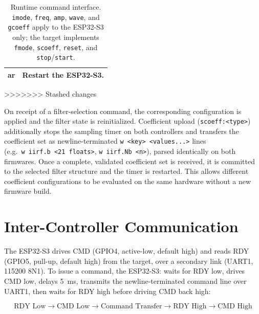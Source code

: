 \begin{table}[H]
\begin{tabularx}{\textwidth}{
        >{\ttfamily\raggedright\arraybackslash}p{}
        >{\raggedright\arraybackslash}X
        }
        ar                                              & Restart the ESP32-S3.                                                \\

        \bottomrule
    \end{tabularx}
    \caption{Runtime command interface. \texttt{imode}, \texttt{freq}, \texttt{amp},
        \texttt{wave}, and \texttt{gcoeff} apply to the ESP32-S3 only; the target
        implements \texttt{fmode}, \texttt{scoeff}, \texttt{reset}, and \texttt{stop}/\texttt{start}.}
    \label{tab:runtime_commands}
>>>>>>> Stashed changes
\end{table}

On receipt of a filter-selection command, the corresponding configuration is
applied and the filter state is reinitialized. Coefficient upload
(\texttt{scoeff:<type>}) additionally stops the sampling timer on both
controllers and transfers the coefficient set as newline-terminated
\texttt{w~<key>~<values...>} lines (e.g.\ \texttt{w~iirf.b~<21~floats>},
\texttt{w~iirf.Nb~<n>}), parsed identically on both firmwares. Once a complete,
validated coefficient set is received, it is committed to the selected filter
structure and the timer is restarted. This allows different coefficient
configurations to be evaluated on the same hardware without a new firmware
build.


\section{Inter-Controller Communication}
\label{sec:inter_controller_communication}

The ESP32-S3 drives CMD (GPIO4, active-low, default high) and reads RDY (GPIO5,
pull-up, default high) from the target, over a secondary link (UART1, 115200
8N1). To issue a command, the ESP32-S3: waits for RDY low, drives CMD low,
delays 5~ms, transmits the newline-terminated command line over UART1, then
waits for RDY high before driving CMD back high:

\begin{equation}
    \boxed{
        \text{RDY Low}
        \rightarrow
        \text{CMD Low}
        \rightarrow
        \text{Command Transfer}
        \rightarrow
        \text{RDY High}
        \rightarrow
        \text{CMD High}
    }
    \label{eq:command_sequence}
\end{equation}

